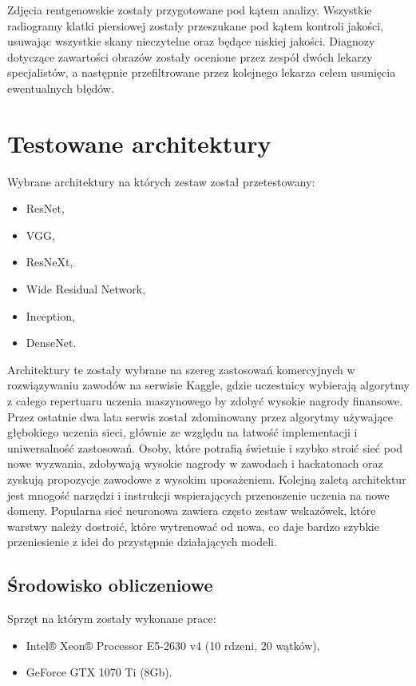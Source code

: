\documentclass[12pt,a4paper,twoside,titlepage,openright]{book}
\begin{document}
Zdjęcia rentgenowskie zostały przygotowane pod kątem analizy. Wszystkie radiogramy klatki piersiowej zostały przeszukane pod kątem kontroli jakości, usuwając wszystkie skany nieczytelne oraz będące niskiej jakości. Diagnozy dotyczące zawartości obrazów zostały ocenione przez zespół dwóch lekarzy specjalistów, a następnie przefiltrowane przez kolejnego lekarza celem usunięcia ewentualnych błędów.

\section{Testowane architektury}
Wybrane architektury na których zestaw został przetestowany:
\begin{itemize} 
\item ResNet,
\item VGG,
\item ResNeXt,
\item Wide Residual Network,
\item Inception,
\item DenseNet.
\end{itemize}

Architektury te zostały wybrane na szereg zastosowań komercyjnych w rozwiązywaniu zawodów na serwisie Kaggle, gdzie uczestnicy wybierają algorytmy z całego repertuaru uczenia maszynowego by zdobyć wysokie nagrody finansowe. Przez ostatnie dwa lata serwis został zdominowany przez algorytmy używające głębokiego uczenia sieci, głównie ze względu na łatwość implementacji i uniwersalność zastosowań. Osoby, które potrafią świetnie i szybko stroić sieć pod nowe wyzwania, zdobywają wysokie nagrody w zawodach i hackatonach oraz zyskują propozycje zawodowe z wysokim uposażeniem. Kolejną zaletą architektur jest mnogość narzędzi i instrukcji wspierających przenoszenie uczenia na nowe domeny. Popularna sieć neuronowa zawiera często zestaw wskazówek, które warstwy należy dostroić, które wytrenować od nowa, co daje bardzo szybkie przeniesienie z idei do przystępnie działających modeli.

\subsection{Środowisko obliczeniowe}
Sprzęt na którym zostały wykonane prace:
\begin{itemize}
\item Intel® Xeon® Processor E5-2630 v4 (10 rdzeni, 20 wątków),
\item GeForce GTX 1070 Ti (8Gb).
\end{itemize}
\end{document}
